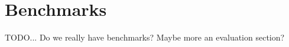 \section{Benchmarks}
\label{sec:benchmarks}

TODO... Do we really have benchmarks? Maybe more an evaluation section?
